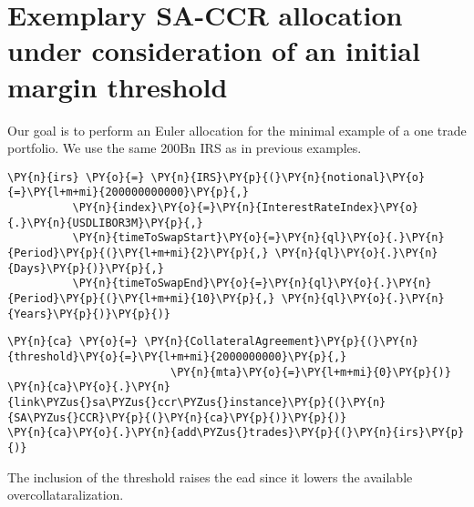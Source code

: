    

    
    \hypertarget{exemplary-sa-ccr-allocation-under-consideration-of-an-initial-margin-threshold}{%
\section{Exemplary SA-CCR allocation under consideration of an initial
margin
threshold}\label{exemplary-sa-ccr-allocation-under-consideration-of-an-initial-margin-threshold}}

Our goal is to perform an Euler allocation for the minimal example of a
one trade portfolio. We use the same 200Bn IRS as in previous examples.

    \begin{tcolorbox}[breakable, size=fbox, boxrule=1pt, pad at break*=1mm,colback=cellbackground, colframe=cellborder]
\begin{Verbatim}[commandchars=\\\{\}]
\PY{n}{irs} \PY{o}{=} \PY{n}{IRS}\PY{p}{(}\PY{n}{notional}\PY{o}{=}\PY{l+m+mi}{200000000000}\PY{p}{,}
          \PY{n}{index}\PY{o}{=}\PY{n}{InterestRateIndex}\PY{o}{.}\PY{n}{USDLIBOR3M}\PY{p}{,}
          \PY{n}{timeToSwapStart}\PY{o}{=}\PY{n}{ql}\PY{o}{.}\PY{n}{Period}\PY{p}{(}\PY{l+m+mi}{2}\PY{p}{,} \PY{n}{ql}\PY{o}{.}\PY{n}{Days}\PY{p}{)}\PY{p}{,}
          \PY{n}{timeToSwapEnd}\PY{o}{=}\PY{n}{ql}\PY{o}{.}\PY{n}{Period}\PY{p}{(}\PY{l+m+mi}{10}\PY{p}{,} \PY{n}{ql}\PY{o}{.}\PY{n}{Years}\PY{p}{)}\PY{p}{)}
\end{Verbatim}
\end{tcolorbox}

    \begin{tcolorbox}[breakable, size=fbox, boxrule=1pt, pad at break*=1mm,colback=cellbackground, colframe=cellborder]
\begin{Verbatim}[commandchars=\\\{\}]
\PY{n}{ca} \PY{o}{=} \PY{n}{CollateralAgreement}\PY{p}{(}\PY{n}{threshold}\PY{o}{=}\PY{l+m+mi}{2000000000}\PY{p}{,}
                         \PY{n}{mta}\PY{o}{=}\PY{l+m+mi}{0}\PY{p}{)}
\PY{n}{ca}\PY{o}{.}\PY{n}{link\PYZus{}sa\PYZus{}ccr\PYZus{}instance}\PY{p}{(}\PY{n}{SA\PYZus{}CCR}\PY{p}{(}\PY{n}{ca}\PY{p}{)}\PY{p}{)}
\PY{n}{ca}\PY{o}{.}\PY{n}{add\PYZus{}trades}\PY{p}{(}\PY{n}{irs}\PY{p}{)}
\end{Verbatim}
\end{tcolorbox}

    The inclusion of the threshold raises the ead since it lowers the
available overcollataralization.

